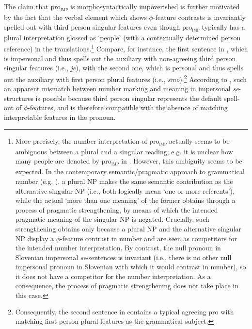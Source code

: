 \documentclass[output=paper,
modfonts,nonflat,
newtxmath
]{langsci/langscibook}
\begin{document}
 \noindent The claim that pro\textsubscript{\textsc{imp}} is morphosyntactically impoverished is further motivated by the fact that the verbal element which shows $\phi$-feature contrasts is invariantly spelled out with third person singular features even though pro\textsubscript{\textsc{imp}} typically has a plural interpretation glossed as `people' (with a contextually determined person reference) in the translations.\footnote{More precisely, the number interpretation of pro\textsubscript{\textsc{imp}} actually seems to be ambiguous between a plural and a singular reading; e.g. it is unclear how many people are denoted by pro\textsubscript{\textsc{imp}} in . However, this ambiguity  seems to be expected. In  the contemporary semantic/pragmatic approach to grammatical number (e.g. \citealt{sauerland2005}), a plural NP makes the same semantic contribution as the alternative singular NP (i.e., both logically mean `one or more referents'), while the actual `more than one meaning' of the former obtains through a process of pragmatic strengthening, by means of which the  intended pragmatic meaning of the singular NP is negated. Crucially, such strengthening obtains only because a plural NP and the alternative singular NP display a $\phi$-feature contrast in number and are seen as competitors for the intended number interpretation.  By contrast, the null pronoun in Slovenian impersonal \textit{se}-sentences is invariant (i.e., there is no other null impersonal pronoun in Slovenian with which it would contrast in number), so it does not have a competitor for the number interpretation. As a consequence, the process of pragmatic strengthening does not take place in this case.} Compare, for instance,  the first sentence in , which is impersonal and thus spells out the auxiliary with non-agreeing third person singular features (i.e., \textit{je}), with the second one, which is personal and thus spells out the auxiliary with first person plural features (i.e., \textit{smo}).\footnote{Consequently, the second sentence in  contains a typical agreeing pro with matching first person plural features as the grammatical subject.} According to \citet{ackema2013}, such an apparent mismatch between number marking and meaning in impersonal \textit{se}-structures is possible because third person singular represents the default spell-out of $\phi$-features,  and is therefore compatible with the absence of matching interpretable features in the pronoun.  \par
 
\end{document}
